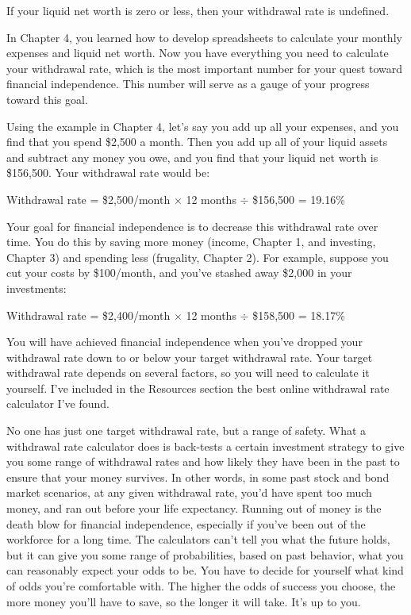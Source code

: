 If your liquid net worth is zero or less, then your withdrawal rate is undefined.

In Chapter 4, you learned how to develop spreadsheets to calculate your monthly expenses and liquid net worth. Now you have everything you need to calculate your withdrawal rate, which is the most important number for your quest toward financial independence. This number will serve as a gauge of your progress toward this goal.

Using the example in Chapter 4, let's say you add up all your expenses, and you find that you spend \$2,500 a month. Then you add up all of your liquid assets and subtract any money you owe, and you find that your liquid net worth is \$156,500. Your withdrawal rate would be:

\begin{center}
Withdrawal rate = \$2,500/month $\times$ 12 months $\div$ \$156,500 = 19.16\%
\end{center}

Your goal for financial independence is to decrease this withdrawal rate over time. You do this by saving more money (income, Chapter 1, and investing, Chapter 3) and spending less (frugality, Chapter 2). For example, suppose you cut your costs by \$100/month, and you've stashed away \$2,000 in your investments:

\begin{center}
Withdrawal rate = \$2,400/month $\times$ 12 months $\div$ \$158,500 = 18.17\%
\end{center}

You will have achieved financial independence when you've dropped your withdrawal rate down to or below your target withdrawal rate. Your target withdrawal rate depends on several factors, so you will need to calculate it yourself. I've included in the Resources section the best online withdrawal rate calculator I've found.

No one has just one target withdrawal rate, but a range of safety. What a withdrawal rate calculator does is back-tests a certain investment strategy to give you some range of withdrawal rates and how likely they have been in the past to ensure that your money survives. In other words, in some past stock and bond market scenarios, at any given withdrawal rate, you'd have spent too much money, and ran out before your life expectancy. Running out of money is the death blow for financial independence, especially if you've been out of the workforce for a long time. The calculators can't tell you what the future holds, but it can give you some range of probabilities, based on past behavior, what you can reasonably expect your odds to be. You have to decide for yourself what kind of odds you're comfortable with. The higher the odds of success you choose, the more money you'll have to save, so the longer it will take. It's up to you.

